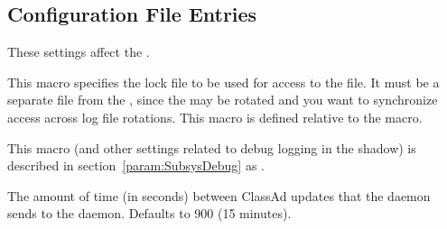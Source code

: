 \subsection{\label{sec:Shadow-Config-File-Entries}
Configuration File Entries}

These settings affect the .
\begin{description}

\label{param:ShadowLock}
\item[\Macro{SHADOW\_LOCK}]
  This macro specifies the lock file to be used for access to the
   file.  It must be a separate file from the
  , since the  may be rotated 
  and you want to synchronize access across log file rotations.
  This macro is defined relative to the  macro.

\label{param:ShadowDebug}
\item[\Macro{SHADOW\_DEBUG}]
  This macro (and other settings related to debug logging in the shadow) is
  described in section~\ref{param:SubsysDebug} as
  .

\label{param:ShadowQueueUpdateInterval}
\item[\Macro{SHADOW\_QUEUE\_UPDATE\_INTERVAL}]
  The amount of time (in seconds) between ClassAd updates that the
   daemon sends to the  daemon.
  Defaults to 900 (15 minutes).


\end{description}
